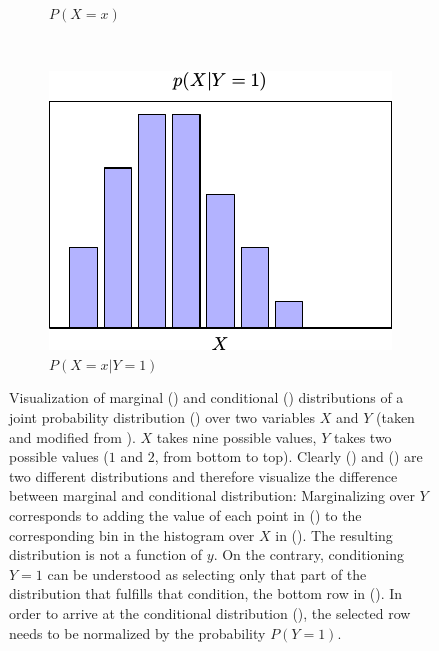 \begin{figure}
\begin{subfigure}[b]{0.3\textwidth}
        \caption{$P(X=x)$}
        \label{fig:probability-example-marginal}
    \end{subfigure}
    ~
    \begin{subfigure}[b]{0.3\textwidth}
        \centering
        \includegraphics[width=\textwidth]{images/probability/conditional-on-y.png}
        \caption{$P(X=x|Y=1)$}
        \label{fig:probability-example-conditional}
    \end{subfigure}
    \caption[Example for joint distribution with marginal and conditional
    distribution]{Visualization of marginal () and
        conditional () distributions of a joint
        probability distribution () over two variables $X$ and
        $Y$ (taken and modified from \citealp[16]{bishop_07_pattern}). $X$ takes nine
        possible values, $Y$ takes two possible values ($1$ and $2$, from bottom to top). Clearly
        () and
        () are two different distributions and
        therefore visualize the difference between marginal and conditional distribution:
        Marginalizing over $Y$ corresponds to adding the value of each point in
        () to the corresponding bin in the histogram over $X$
        in (). The resulting distribution is not a function
        of $y$. On the contrary, conditioning $Y=1$ can be understood as selecting only that part of
        the distribution that fulfills that condition, \ie the bottom row in
        (). In order to arrive at the conditional distribution
        (), the selected row needs to be normalized by
        the probability $P(Y=1)$.}
    \label{fig:probability-vis}
\end{figure}

